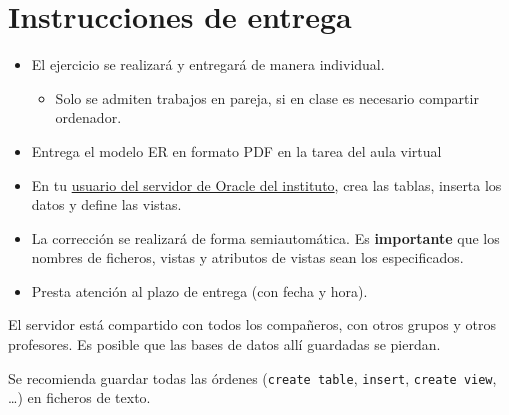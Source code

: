 \documentclass[a4paper]{article}
\begin{document}
\section{Instrucciones de entrega}
\label{sec:org000000f}
\begin{itemize}
\item El ejercicio se realizará y entregará de manera individual.
\begin{itemize}
\item Solo se admiten trabajos en pareja, si en clase es necesario compartir ordenador.
\end{itemize}
\item Entrega el modelo ER en formato PDF en la tarea del aula virtual
\item En tu \href{https://aulavirtual3.educa.madrid.org/ies.alonsodeavellan.alcala/mod/assign/view.php?id=29534}{usuario del servidor de Oracle del instituto}, crea las tablas, inserta los datos y define las vistas.
\item La corrección se realizará de forma semiautomática. Es \textbf{importante} que los nombres de ficheros, vistas y atributos de vistas sean los especificados.
\item Presta atención al plazo de entrega (con fecha y hora).
\end{itemize}


\begin{Aviso}
El servidor está compartido con todos los compañeros, con otros grupos y otros profesores. Es posible que las bases de datos allí guardadas se pierdan.

Se recomienda guardar todas las órdenes (\texttt{create table}, \texttt{insert}, \texttt{create view}, \ldots) en ficheros de texto.
\end{Aviso}
\end{document}
